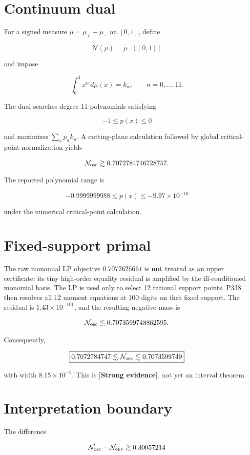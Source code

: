 \documentclass[11pt,a4paper,openany]{report}
\newcommand{\statusStrong}{\textcolor{finblue}{[Strong evidence]}}
\begin{document}
\section{Continuum dual}

For a signed measure \(\mu=\mu_+-\mu_-\) on \([0,1]\), define

\[
\mathcal N(\mu)=\mu_-([0,1])
\]

and impose

\[
\int_0^1 x^n\,d\mu(x)=k_n,\qquad n=0,\ldots,11.
\]

The dual searches degree-11 polynomials satisfying

\[
-1\leq p(x)\leq0
\]

and maximizes \(\sum_n p_nk_n\). A cutting-plane calculation followed by global critical-point normalization yields

\[
\mathcal N_{\rm osc}\gtrsim0.7072784746728757.
\]

The reported polynomial range is

\[
-0.9999999988\leq p(x)\leq-9.97\times10^{-10}
\]

under the numerical critical-point calculation.

\section{Fixed-support primal}

The raw monomial LP objective \(0.7072626661\) is \textbf{not} treated as an upper certificate: its tiny high-order equality residual is amplified by the ill-conditioned monomial basis. The LP is used only to select 12 rational support points. P338 then resolves all 12 moment equations at 100 digits on that fixed support. The residual is \(1.43\times10^{-101}\), and the resulting negative mass is

\[
\mathcal N_{\rm osc}\lesssim0.7073599748862595.
\]

Consequently,

\[
\boxed{
0.7072784747\lesssim\mathcal N_{\rm osc}
\lesssim0.7073599749
}
\]

with width \(8.15\times10^{-5}\). This is \textbf{\statusStrong{}}, not yet an interval theorem.

\section{Interpretation boundary}

The difference

\[
\mathcal N_{\rm osc}-\mathcal N_{\rm env}\gtrsim0.30057214
\]
\end{document}
